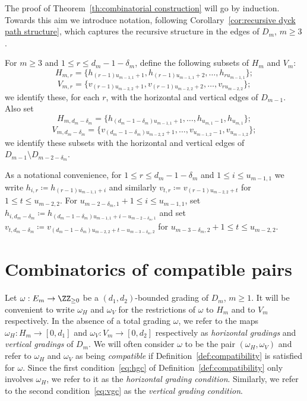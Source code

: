 The proof of Theorem~\ref{th:combinatorial construction} will go by induction. Towards this aim we introduce notation, following Corollary~\ref{cor:recursive dyck path structure}, which captures the recursive structure in the edges of $D_m$, $m\ge3$. 
\begin{definition}
 \label{def:subpath edges}
 For $m\ge3$ and $1\le r\le d_m-1-\delta_m$, define the following subsets of $H_m$ and $V_m$: 
 \[H_{m,r}=\{h_{(r-1)u_{m-1,1}+1},h_{(r-1)u_{m-1,1}+2},\ldots,h_{ru_{m-1,1}}\};\]
 \[V_{m,r}=\{v_{(r-1)u_{m-2,2}+1},v_{(r-1)u_{m-2,2}+2},\ldots,v_{ru_{m-2,2}}\};\]
 we identify these, for each $r$, with the horizontal and vertical edges of $D_{m-1}$. Also set 
 \[H_{m,d_m-\delta_m}=\{h_{(d_m-1-\delta_m)u_{m-1,1}+1},\ldots,h_{u_{m,1}-1},h_{u_{m,1}}\};\]
 \[V_{m,d_m-\delta_m}=\{v_{(d_m-1-\delta_m)u_{m-2,2}+1},\ldots,v_{u_{m-1,2}-1},v_{u_{m-1,2}}\};\]
 we identify these subsets with the horizontal and vertical edges of $D_{m-1}\setminus D_{m-2-\delta_m}$.

 As a notational convenience, for $1\le r\le d_m-1-\delta_m$ and $1\le i\le u_{m-1,1}$ we write $h_{i,r}\coloneqq h_{(r-1)u_{m-1,1}+i}$ and similarly $v_{t,r}\coloneqq v_{(r-1)u_{m-2,2}+t}$ for $1\le t\le u_{m-2,2}$. 
 For $u_{m-2-\delta_m,1}+1\le i\le u_{m-1,1}$, set $h_{i,d_m-\delta_m}\coloneqq h_{(d_m-1-\delta_m)u_{m-1,1}+i-u_{m-2-\delta_m,1}}$ and set $v_{t,d_m-\delta_m}\coloneqq v_{(d_m-1-\delta_m)u_{m-2,2}+t-u_{m-3-\delta_m,2}}$ for $u_{m-3-\delta_m,2}+1\le t\le u_{m-2,2}$.
\end{definition}


\section{Combinatorics of compatible pairs}
\label{sec:compatible pairs}

\noindent
Let $\omega:E_m\to\ZZ_{\ge0}$ be a $(d_1,d_2)$-bounded grading of $D_m$, $m\ge1$. 
It will be convenient to write $\omega_H$ and $\omega_V$ for the restrictions of $\omega$ to $H_m$ and to $V_m$ respectively. 
In the absence of a total grading $\omega$, we refer to the maps $\omega_H:H_m\to[0,d_1]$ and $\omega_V:V_m\to[0,d_2]$ respectively as \emph{horizontal gradings} and \emph{vertical gradings} of $D_m$. 
We will often consider $\omega$ to be the pair $(\omega_H,\omega_V)$ and refer to $\omega_H$ and $\omega_V$ as being \emph{compatible} if Definition~\ref{def:compatibility} is satisfied for $\omega$. 
Since the first condition~\eqref{eq:hgc} of Definition~\ref{def:compatibility} only involves $\omega_H$, we refer to it as the \emph{horizontal grading condition}. 
Similarly, we refer to the second condition~\eqref{eq:vgc} as the \emph{vertical grading condition}.

